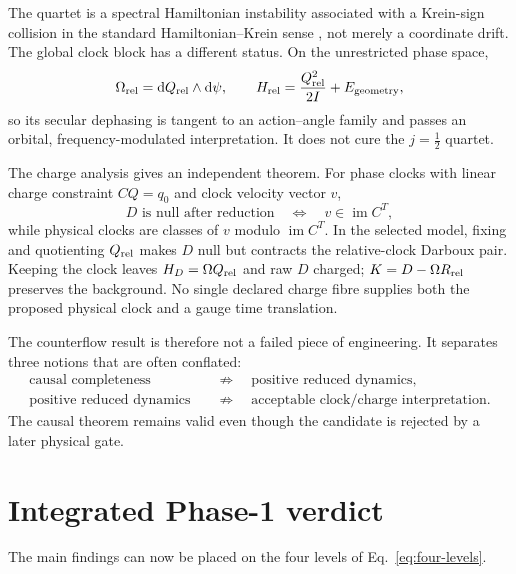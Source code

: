 \documentclass[11pt]{article}
\newcommand{\dd}{\mathrm d}
\newcommand{\im}{\operatorname{im}}
\begin{document}
The quartet is a spectral Hamiltonian instability associated with a
Krein-sign collision in the standard Hamiltonian--Krein sense
\cite{KapitulaPromislow}, not merely a coordinate drift.  The global clock block
has a different status.  On the unrestricted phase space,
\begin{equation}
 \Omega_{\rm rel}=\dd Q_{\rm rel}\wedge\dd\psi,
 \qquad
 H_{\rm rel}=\frac{Q_{\rm rel}^2}{2I}+E_{\rm geometry},
\end{equation}
so its secular dephasing is tangent to an action--angle family and passes an
orbital, frequency-modulated interpretation.  It does not cure the
$j=\tfrac12$ quartet.

The charge analysis gives an independent theorem.  For phase clocks with
linear charge constraint $CQ=q_0$ and clock velocity vector $v$,
\begin{equation}
 D\text{ is null after reduction}
 \quad\Longleftrightarrow\quad
 v\in\im C^T,
\end{equation}
while physical clocks are classes of $v$ modulo $\im C^T$.  In the selected
model, fixing and quotienting $Q_{\rm rel}$ makes $D$ null but contracts the
relative-clock Darboux pair.  Keeping the clock leaves
\(
H_D=\Omega Q_{\rm rel}
\)
and raw $D$ charged; $K=D-\Omega R_{\rm rel}$ preserves the background.  No
single declared charge fibre supplies both the proposed physical clock and a
gauge time translation.

The counterflow result is therefore not a failed piece of engineering.  It
separates three notions that are often conflated:
\begin{equation}
 \begin{aligned}
 \text{causal completeness}
 &\quad\not\Rightarrow\quad
 \text{positive reduced dynamics},\\
 \text{positive reduced dynamics}
 &\quad\not\Rightarrow\quad
 \text{acceptable clock/charge interpretation}.
 \end{aligned}
\end{equation}
The causal theorem remains valid even though the candidate is rejected by a
later physical gate.

\section{Integrated Phase-1 verdict}

The main findings can now be placed on the four levels of
Eq.~\eqref{eq:four-levels}.
\end{document}

